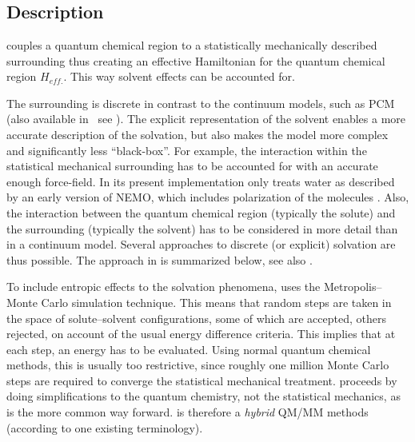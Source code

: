 \section{}
\label{UG:sec:qmstat}

\subsection{Description}
\label{UG:sec:qmstat_description}

 couples a quantum chemical region to a
statistically mechanically described surrounding thus creating
an effective Hamiltonian for the quantum chemical region
$H_{eff.}$. This way solvent effects can be
accounted for.

The surrounding is discrete in contrast to the
continuum models, such as PCM (also available in \molcas\, see
). The explicit representation of the solvent
enables a more accurate description of the solvation,
but also makes the model more complex and significantly
less ``black-box''.
For example, the interaction within the statistical
mechanical surrounding has to be accounted for with an
accurate enough force-field. In its present implementation
 only treats water as described by an early
version of NEMO, which includes polarization of the
molecules \cite{Wallqvist:90}. Also, the interaction
between the quantum chemical region (typically the solute) and
the surrounding (typically the solvent) has to be considered
in more detail than in a continuum model.
Several approaches to discrete (or explicit) solvation are
thus possible.
The approach in  is summarized below, see
also \cite{Moriarty:96,Ohrn:06a,Ohrn:07a,Ohrn:Thesis}.

To include entropic effects to the solvation phenomena,
 uses the Metropolis--Monte Carlo simulation
technique. This means that random steps are taken in the
space of solute--solvent configurations, some of which are
accepted, others rejected, on account of the usual energy
difference criteria. This implies that at each step, an
energy has to be evaluated. Using normal quantum chemical
methods, this is usually too restrictive, since roughly one
million Monte Carlo steps are required to converge the statistical
mechanical treatment.  proceeds by doing
simplifications to the quantum chemistry, not the statistical
mechanics, as is the more common way forward. 
is therefore a \emph{hybrid} QM/MM methods (according to one
existing terminology).

